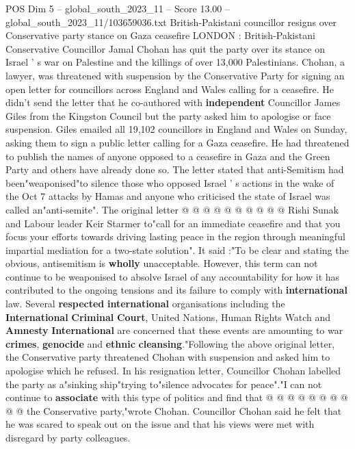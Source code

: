 \begin{textsample}{POS Dim 5 – global\_south\_2023\_11 – Score 13.00 – global\_south\_2023\_11/103659036.txt}  \label{ex:f5_pos_275}
British-Pakistani councillor resigns over Conservative party stance on Gaza ceasefire LONDON : British-Pakistani Conservative Councillor Jamal Chohan has quit the party over its stance on Israel ' s war on Palestine and the killings of over 13,000 Palestinians.
Chohan, a lawyer, was threatened with suspension by the Conservative Party for signing an open letter for councillors across England and Wales calling for a ceasefire.
He didn't send the letter that he co-authored with \textbf{independent} Councillor James Giles from the Kingston Council but the party asked him to apologise or face suspension.
Giles emailed all 19,102 councillors in England and Wales on Sunday, asking them to sign a public letter calling for a Gaza ceasefire.
He had threatened to publish the names of anyone opposed to a ceasefire in Gaza and the Green Party and others have already done so.
The letter stated that anti-Semitism had been"weaponised"to silence those who opposed Israel ' s actions in the wake of the Oct 7 attacks by Hamas and anyone who criticised the state of Israel was called an"anti-semite".
The original letter @ @ @ @ @ @ @ @ @ @ Rishi Sunak and Labour leader Keir Starmer to"call for an immediate ceasefire and that you focus your efforts towards driving lasting peace in the region through meaningful impartial mediation for a two-state solution".
It said :"To be clear and stating the obvious, antisemitism is \textbf{wholly} unacceptable.
However, this term can not continue to be weaponised to absolve Israel of any accountability for how it has contributed to the ongoing tensions and its failure to comply with \textbf{international} law.
Several \textbf{respected} \textbf{international} organisations including the \textbf{International} \textbf{Criminal} \textbf{Court}, United Nations, Human Rights Watch and \textbf{Amnesty} \textbf{International} are concerned that these events are amounting to war \textbf{crimes}, \textbf{genocide} and \textbf{ethnic} \textbf{cleansing}."Following the above original letter, the Conservative party threatened Chohan with suspension and asked him to apologise which he refused.
In his resignation letter, Councillor Chohan labelled the party as a"sinking ship"trying to"silence advocates for peace"."I can not continue to \textbf{associate} with this type of politics and find that @ @ @ @ @ @ @ @ @ @ the Conservative party,"wrote Chohan.
Councillor Chohan said he felt that he was scared to speak out on the issue and that his views were met with disregard by party colleagues.

\end{textsample}
